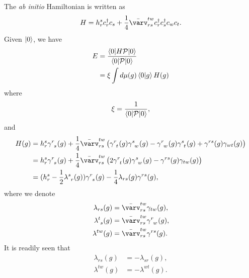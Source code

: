 \documentclass[11pt,letterpaper]{article}
\begin{document}
The \textit{ab initio} Hamiltonian is written as
\begin{equation}
  H
  = h_r^s c^\dag_r c_s + \frac{1}{4} \bar{\varv}_{rs}^{tw} c^\dag_r c^\dag_s c_w c_t.
\end{equation}
Given $\ket{0}$, we have
\begin{subequations}
\begin{align}
  E
  &= \frac{\braket{0|H\mathcal{P}|0}}{\braket{0|\mathcal{P}|0}}\\
  &= \xi \int d\mu(g) \braket{0|g} H(g)
\end{align}
\end{subequations}
where
\begin{equation}
  \xi = \frac{1}{\braket{0|\mathcal{P}|0}},
\end{equation}
and
\begin{subequations}
\begin{align}
  H(g)
  &= h_r^s \gamma^{r\phantom{s}}_{\phantom{r}s}(g)
  + \frac{1}{4} \bar{\varv}_{rs}^{tw} \left(
    \gamma^{r\phantom{t}}_{\phantom{r}t}(g) \gamma^{s\phantom{w}}_{\phantom{s}w}(g)
    - \gamma^{r\phantom{w}}_{\phantom{r}w}(g) \gamma^{s\phantom{t}}_{\phantom{s}t}(g)
    + \gamma^{rs}(g) \gamma_{wt}(g)
  \right)\\
  &= h_r^s \gamma^{r\phantom{s}}_{\phantom{r}s}(g)
  + \frac{1}{4} \bar{\varv}_{rs}^{tw} \left(
    2 \gamma^{r\phantom{t}}_{\phantom{r}t}(g) \gamma^{s\phantom{w}}_{\phantom{s}w}(g)
    - \gamma^{rs}(g) \gamma_{tw}(g)
  \right)\\
  &= (h_r^s - \frac{1}{2} \lambda^{s\phantom{r}}_{\phantom{s}r}(g))
  \gamma^{r\phantom{s}}_{\phantom{r}s}(g)
  - \frac{1}{4} \lambda_{rs}(g) \gamma^{rs}(g),
\end{align}
\end{subequations}
where we denote
\begin{subequations}
\begin{align}
  \lambda_{rs}(g)
  &= \bar{\varv}_{rs}^{tw} \gamma_{tw}(g),\\
  \lambda^{t\phantom{s}}_{\phantom{t}s}(g)
  &= \bar{\varv}_{rs}^{tw} \gamma^{r\phantom{w}}_{\phantom{r}w}(g),\\
  \lambda^{tw}(g)
  &= \bar{\varv}_{rs}^{tw} \gamma^{rs}(g).
\end{align}
\end{subequations}
It is readily seen that
\begin{subequations}
\begin{align}
  \lambda_{rs}(g) &= -\lambda_{sr}(g),\\
  \lambda^{tw}(g) &= -\lambda^{wt}(g).
\end{align}
\end{subequations}
\end{document}
